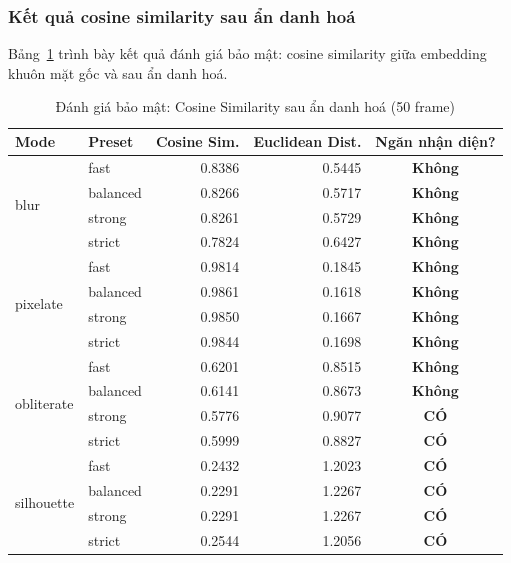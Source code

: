 \subsubsection{Kết quả cosine similarity sau ẩn danh hoá}

Bảng~\ref{tab:security_full} trình bày kết quả đánh giá bảo mật: cosine similarity giữa embedding khuôn mặt gốc và sau ẩn danh hoá.

\begin{table}[H]
\centering
\caption{Đánh giá bảo mật: Cosine Similarity sau ẩn danh hoá (50 frame)}
\label{tab:security_full}
\begin{tabular}{|l|l|r|r|c|}
\hline
\textbf{Mode} & \textbf{Preset} & \textbf{Cosine Sim.} & \textbf{Euclidean Dist.} & \textbf{Ngăn nhận diện?} \\
\hline
\multirow{4}{*}{blur}
& fast     & 0.8386 & 0.5445 & \textbf{Không} \\
& balanced & 0.8266 & 0.5717 & \textbf{Không} \\
& strong   & 0.8261 & 0.5729 & \textbf{Không} \\
& strict   & 0.7824 & 0.6427 & \textbf{Không} \\
\hline
\multirow{4}{*}{pixelate}
& fast     & 0.9814 & 0.1845 & \textbf{Không} \\
& balanced & 0.9861 & 0.1618 & \textbf{Không} \\
& strong   & 0.9850 & 0.1667 & \textbf{Không} \\
& strict   & 0.9844 & 0.1698 & \textbf{Không} \\
\hline
\multirow{4}{*}{obliterate}
& fast     & 0.6201 & 0.8515 & \textbf{Không} \\
& balanced & 0.6141 & 0.8673 & \textbf{Không} \\
& strong   & 0.5776 & 0.9077 & \textcolor{green!50!black}{\textbf{CÓ}} \\
& strict   & 0.5999 & 0.8827 & \textcolor{green!50!black}{\textbf{CÓ}} \\
\hline
\multirow{4}{*}{silhouette}
& fast     & 0.2432 & 1.2023 & \textcolor{green!50!black}{\textbf{CÓ}} \\
& balanced & 0.2291 & 1.2267 & \textcolor{green!50!black}{\textbf{CÓ}} \\
& strong   & 0.2291 & 1.2267 & \textcolor{green!50!black}{\textbf{CÓ}} \\
& strict   & 0.2544 & 1.2056 & \textcolor{green!50!black}{\textbf{CÓ}} \\
\hline
\end{tabular}
\end{table}

